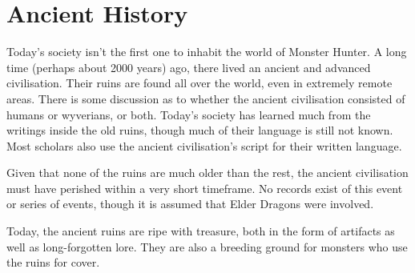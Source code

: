 \chapter{Ancient History}
Today's society isn't the first one to inhabit the world of Monster Hunter. A long time (perhaps about 2000 years) ago, there lived an ancient and advanced civilisation. Their ruins are found all over the world, even in extremely remote areas. There is some discussion as to whether the ancient civilisation consisted of humans or wyverians, or both. Today's society has learned much from the writings inside the old ruins, though much of their language is still not known. Most scholars also use the ancient civilisation's script for their written language.

Given that none of the ruins are much older than the rest, the ancient civilisation must have perished within a very short timeframe. No records exist of this event or series of events, though it is assumed that Elder Dragons were involved.

Today, the ancient ruins are ripe with treasure, both in the form of artifacts as well as long-forgotten lore. They are also a breeding ground for monsters who use the ruins for cover.
\newpage
\hbWideBottomArtFirstPageFix
